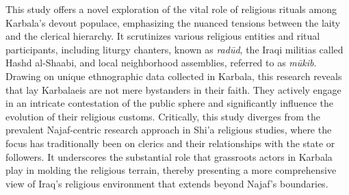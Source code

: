 This study offers a novel exploration of the vital role of religious rituals among Karbala's devout populace, emphasizing the nuanced tensions between the laity and the clerical hierarchy. It scrutinizes various religious entities and ritual participants, including liturgy chanters, known as \emph{radūd}, the Iraqi militias called Hashd al-Shaabi, and local neighborhood assemblies, referred to as \emph{mūkib}. Drawing on unique ethnographic data collected in Karbala, this research reveals that lay Karbalaeis are not mere bystanders in their faith. They actively engage in an intricate contestation of the public sphere and significantly influence the evolution of their religious customs. Critically, this study diverges from the prevalent Najaf-centric research approach in Shi'a religious studies, where the focus has traditionally been on clerics and their relationships with the state or followers. It underscores the substantial role that grassroots actors in Karbala play in molding the religious terrain, thereby presenting a more comprehensive view of Iraq's religious environment that extends beyond Najaf's boundaries.